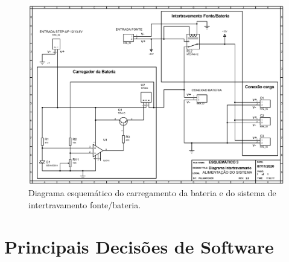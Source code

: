\begin{apendicesenv}
\begin{landscape}
\label{diagramas_energia_intertravamento}
\begin{figure}[!htb]
    \centering
     \includegraphics[width=1.2\textwidth, height=2\textheight,keepaspectratio]{figuras/energia/diagramas/diagrama_esq_bateria.pdf}
    \caption{Diagrama esquemático do carregamento da bateria e do sistema de intertravamento fonte/bateria.}
    \label{fig:diagrama_fonte3}
\end{figure}
\end{landscape}


\chapter{Principais Decisões de Software}\label{principais_decisoes_software}


\end{apendicesenv}
